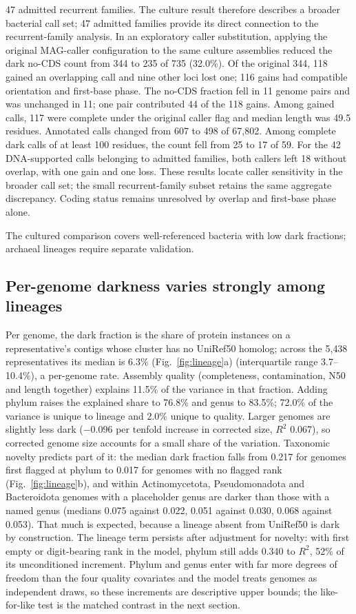 \documentclass[11pt]{article}
\begin{document}
47 admitted recurrent families. The culture result therefore describes a broader bacterial
call set; 47 admitted families provide its direct connection to the recurrent-family analysis.
In an exploratory caller substitution, applying the original MAG-caller configuration to the same culture assemblies reduced the dark no-CDS count from 344 to 235 of 735 (32.0\%). Of the original 344, 118 gained an overlapping call and nine other loci lost one; 116 gains had compatible orientation and first-base phase. The no-CDS fraction fell in 11 genome pairs and was unchanged in 11; one pair contributed 44 of the 118 gains. Among gained calls, 117 were complete under the original caller flag and median length was 49.5 residues. Annotated calls changed from 607 to 498 of 67{,}802. Among complete dark calls of at least 100 residues, the count fell from 25 to 17 of 59. For the 42 DNA-supported calls belonging to admitted families, both callers left 18 without overlap, with one gain and one loss. These results locate caller sensitivity in the broader call set; the small recurrent-family subset retains the same aggregate discrepancy. Coding status remains unresolved by overlap and first-base phase alone.

The cultured comparison covers well-referenced bacteria with low dark
fractions; archaeal lineages require separate validation.

\subsection*{Per-genome darkness varies strongly among lineages}

Per genome, the dark fraction is the share of protein instances on a representative's contigs whose
cluster has no UniRef50 homolog; across the 5{,}438 representatives its median is 6.3\% (Fig.~\ref{fig:lineage}a)
(interquartile range 3.7--10.4\%), a per-genome rate. Assembly quality (completeness, contamination, N50 and length together) explains 11.5\% of the
variance in that fraction. Adding phylum raises the explained share to 76.8\% and genus to 83.5\%;
72.0\% of the variance is unique to lineage and 2.0\% unique to quality.
Larger genomes are slightly less dark ($-0.096$ per tenfold increase in corrected size, $R^2$ 0.067),
so corrected genome size accounts for a small share of the variation. Taxonomic novelty predicts part of it: the median dark
fraction falls from 0.217 for genomes first flagged at phylum to 0.017 for genomes with no flagged rank
(Fig.~\ref{fig:lineage}b), and within Actinomycetota, Pseudomonadota and Bacteroidota genomes with a
placeholder genus are darker than those with a named genus (medians 0.075 against 0.022, 0.051
against 0.030, 0.068 against 0.053). That much is expected, because a lineage absent from UniRef50
is dark by construction. The lineage term persists after adjustment for novelty: with first empty or digit-bearing rank in the
model, phylum still adds 0.340 to $R^2$, 52\% of its unconditioned increment. Phylum and genus enter
with far more degrees of freedom than the four quality covariates and the model treats genomes as
independent draws, so these increments are descriptive upper bounds; the like-for-like test is the
matched contrast in the next section.
\end{document}
